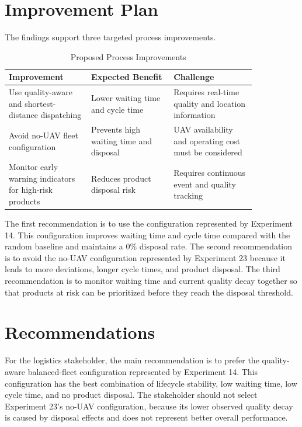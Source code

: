 \documentclass[conference]{IEEEtran}
\begin{document}
\section{Improvement Plan}

The findings support three targeted process improvements.

\begin{table}[t]
\caption{Proposed Process Improvements}
\label{tab:improvements}
\centering
\begin{tabular}{|p{0.28\linewidth}|p{0.28\linewidth}|p{0.28\linewidth}|}
\hline
\textbf{Improvement} & \textbf{Expected Benefit} & \textbf{Challenge} \\
\hline
Use quality-aware and shortest-distance dispatching & Lower waiting time and cycle time & Requires real-time quality and location information \\
\hline
Avoid no-UAV fleet configuration & Prevents high waiting time and disposal & UAV availability and operating cost must be considered \\
\hline
Monitor early warning indicators for high-risk products & Reduces product disposal risk & Requires continuous event and quality tracking \\
\hline
\end{tabular}
\end{table}

The first recommendation is to use the configuration represented by Experiment 14. This configuration improves waiting time and cycle time compared with the random baseline and maintains a 0\% disposal rate. The second recommendation is to avoid the no-UAV configuration represented by Experiment 23 because it leads to more deviations, longer cycle times, and product disposal. The third recommendation is to monitor waiting time and current quality decay together so that products at risk can be prioritized before they reach the disposal threshold.

\section{Recommendations}

For the logistics stakeholder, the main recommendation is to prefer the quality-aware balanced-fleet configuration represented by Experiment 14. This configuration has the best combination of lifecycle stability, low waiting time, low cycle time, and no product disposal. The stakeholder should not select Experiment 23's no-UAV configuration, because its lower observed quality decay is caused by disposal effects and does not represent better overall performance.
\end{document}
